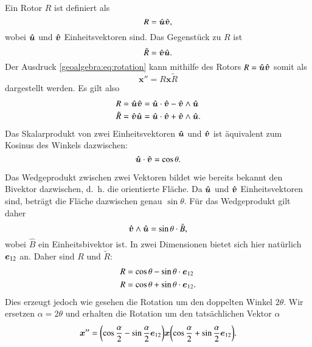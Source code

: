 Ein Rotor $R$ ist definiert als
\begin{equation*}
  R = \u \v,
\end{equation*}
wobei $\u$ und $\v$ Einheitsvektoren sind.
Das Gegenstück zu $R$ ist
\begin{equation*}
  \tilde{R} = \v \u.
\end{equation*}
Der Ausdruck \eqref{geoalgebra:eq:rotation} kann mithilfe des Rotors $R = \u \v$ somit als
\begin{equation*}
  \boldsymbol{x}'' = R \boldsymbol{x} \tilde{R}
\end{equation*}
dargestellt werden.
Es gilt also
\begin{align*}
  R &= \u \v = \u \cdot \v - \v \wedge \u \\
  \tilde{R} &= \v \u = \u \cdot \v + \v \wedge \u.
\end{align*}
Das Skalarprodukt von zwei Einheitsvektoren $\u$ und $\v$ ist äquivalent zum Kosinus des Winkels dazwischen:
\begin{equation*}
  \u \cdot \v = \cos{\theta}.
\end{equation*}

Das Wedgeprodukt zwischen zwei Vektoren bildet wie bereits bekannt den Bivektor dazwischen, d.~h. die orientierte Fläche.
Da $\u$ und $\v$ Einheitsvektoren sind, beträgt die Fläche dazwischen genau $\sin{\theta}$. Für das Wedgeprodukt gilt daher
\begin{equation*}
  \v \wedge \u = \sin{\theta} \cdot \hat{B},
\end{equation*}
wobei $\hat{B}$ ein Einheitsbivektor ist. In zwei Dimensionen bietet sich hier natürlich $\eot$ an.
Daher sind $R$ und $\tilde{R}$:
\begin{align*}
  R &= \cos{\theta} - \sin{\theta} \cdot \eot \\
  R &= \cos{\theta} + \sin{\theta} \cdot \eot.
\end{align*}
Dies erzeugt jedoch wie gesehen die Rotation um den doppelten Winkel $2 \theta$. Wir ersetzen $\alpha = 2\theta$ und erhalten die Rotation um
den tatsächlichen Vektor $\alpha$
\begin{equation*}
  \boldsymbol{x}'' = \biggl(\cos{\frac{\alpha}{2}} - \sin{\frac{\alpha}{2}} \eot \biggr) \boldsymbol{x} \biggl(\cos{\frac{\alpha}{2}} + \sin{\frac{\alpha}{2}} \eot \biggr).
\end{equation*}


